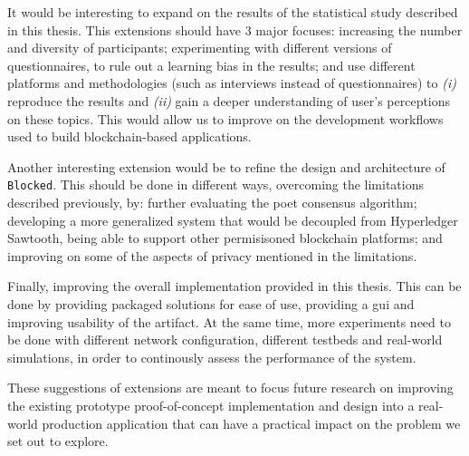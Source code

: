 It would be interesting to expand on the results of the statistical study described in this thesis. This extensions should have 3 major focuses: increasing the number and diversity of participants; experimenting with different versions of questionnaires, to rule out a learning bias in the results; and use different platforms and methodologies (such as interviews instead of questionnaires) to \emph{(i)} reproduce the results and \emph{(ii)} gain a deeper understanding of user's perceptions on these topics. This would allow us to improve on the development workflows used to build blockchain-based applications.

Another interesting extension would be to refine the design and architecture of \texttt{Blocked}. This should be done in different ways, overcoming the limitations described previously, by: further evaluating the \gls{poet} consensus algorithm; developing a more generalized system that would be decoupled from Hyperledger Sawtooth, being able to support other permisisoned blockchain platforms; and improving on some of the aspects of privacy mentioned in the limitations.

Finally, improving the overall implementation provided in this thesis. This can be done by providing packaged solutions for ease of use, providing a \gls{gui} and improving usability of the artifact. At the same time, more experiments need to be done with different network configuration, different testbeds and real-world simulations, in order to continously assess the performance of the system.

These suggestions of extensions are meant to focus future research on improving the existing prototype proof-of-concept implementation and design into a real-world production application that can have a practical impact on the problem we set out to explore.




